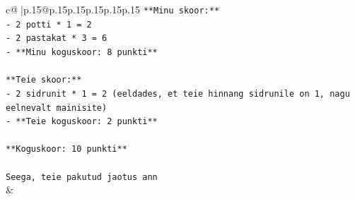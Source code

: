 \documentclass{article}
\begin{document}
{\begin{supertabular}{c@{$\;$}|p{.15\linewidth}@{}p{.15\linewidth}p{.15\linewidth}p{.15\linewidth}p{.15\linewidth}p{.15\linewidth}}
{{{\texttt{**Minu skoor:**} \\
\texttt{{-} 2 potti * 1 = 2} \\
\texttt{{-} 2 pastakat * 3 = 6} \\
\texttt{{-} **Minu koguskoor: 8 punkti**} \\
\\ 
\texttt{**Teie skoor:**} \\
\texttt{{-} 2 sidrunit * 1 = 2 (eeldades, et teie hinnang sidrunile on 1, nagu eelnevalt mainisite)} \\
\texttt{{-} **Teie koguskoor: 2 punkti**} \\
\\ 
\texttt{**Koguskoor: 10 punkti**} \\
\\ 
\texttt{Seega, teie pakutud jaotus ann} \\
            }
        }
    }
    & \\ \\


\end{supertabular}}
\end{document}
